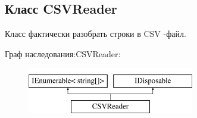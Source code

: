 \subsection{Класс C\+S\+V\+Reader}
\label{classkdz__manager_1_1_c_s_v_reader}


Класс фактически разобрать строки в C\+S\+V -\/файл.  


Граф наследования\+:C\+S\+V\+Reader\+:\begin{figure}[H]
\begin{center}
\leavevmode
\includegraphics[height=2.000000cm]{classkdz__manager_1_1_c_s_v_reader}
\end{center}
\end{figure}
